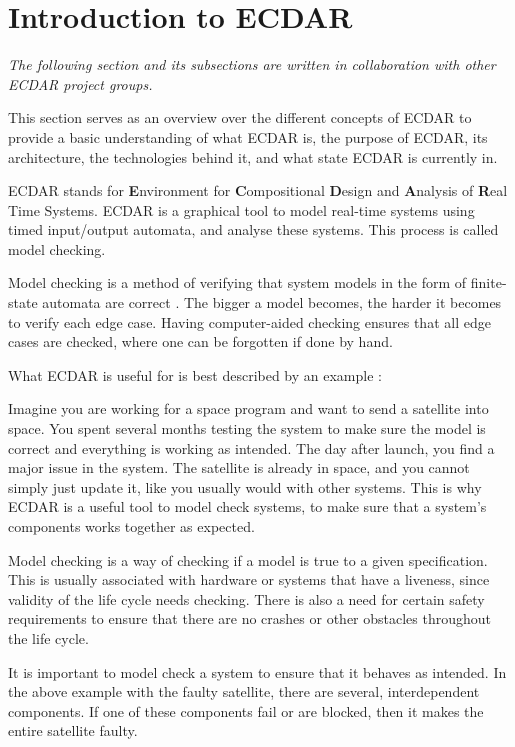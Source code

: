 \section{Introduction to ECDAR}\label{sec:introduction-to-ecdar}
\textit{The following section and its subsections are written in collaboration with other ECDAR project groups.}\vspace{1em}

This section serves as an overview over the different concepts of ECDAR to provide a basic understanding of what ECDAR is, the purpose of ECDAR, its architecture, the technologies behind it, and what state ECDAR is currently in.

ECDAR stands for \textbf{E}nvironment for \textbf{C}ompositional \textbf{D}esign and \textbf{A}nalysis of \textbf{R}eal Time Systems.
ECDAR is a graphical tool to model real-time systems using timed input/output automata, and analyse these systems. 
This process is called model checking. 

Model checking is a method of verifying that system models in the form of finite-state automata are correct \cite{modelchecking-handbook}. 
The bigger a model becomes, the harder it becomes to verify each edge case. 
Having computer-aided checking ensures that all edge cases are checked, where one can be forgotten if done by hand.

What ECDAR is useful for is best described by an example \label{ECDAR:satellite}:

Imagine you are working for a space program and want to send a satellite into space.
You spent several months testing the system to make sure the model is correct and everything is working as intended.
The day after launch, you find a major issue in the system.
The satellite is already in space, and you cannot simply just update it, like you usually would with other systems. 
This is why ECDAR is a useful tool to model check systems, to make sure that a system's components works together as expected.

Model checking is a way of checking if a model is true to a given specification.
This is usually associated with hardware or systems that have a liveness, since validity of the life cycle needs checking.
There is also a need for certain safety requirements to ensure that there are no crashes or other obstacles throughout the life cycle.

It is important to model check a system to ensure that it behaves as intended.
In the above example with the faulty satellite, there are several, interdependent components.
If one of these components fail or are blocked, then it makes the entire satellite faulty.

